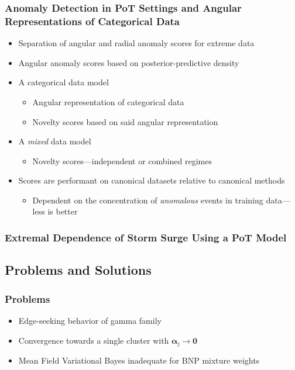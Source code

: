 \documentclass[aspectratio=169,10pt]{beamer}
\begin{document}
\begin{frame}
    \frametitle{Anomaly Detection in PoT Settings and Angular Representations of Categorical Data}
    \begin{itemize}
        \item Separation of angular and radial anomaly scores for extreme data
        \item Angular anomaly scores based on posterior-predictive density
        \item A categorical data model
        \begin{itemize}
            \item Angular representation of categorical data
            \item Novelty scores based on said angular representation
        \end{itemize}
        \item A \emph{mixed} data model
        \begin{itemize}
            \item Novelty scores---independent or combined regimes
        \end{itemize}
        \item Scores are performant on canonical datasets relative to canonical methods
        \begin{itemize}
            \item Dependent on the concentration of \emph{anomalous} events in training data---less is better
        \end{itemize}
    \end{itemize}
\end{frame}

\begin{frame}
    \frametitle{Extremal Dependence of Storm Surge Using a PoT Model}
\end{frame}

\subsection{Problems and Solutions}

\begin{frame}
    \frametitle{Problems}
    \begin{itemize}
        \item Edge-seeking behavior of gamma family
        \item Convergence towards a single cluster with $\bm{\alpha}_{\jmath} \to \bm{0}$
        \item Mean Field Variational Bayes inadequate for BNP mixture weights
    \end{itemize}
\end{frame}
\end{document}
